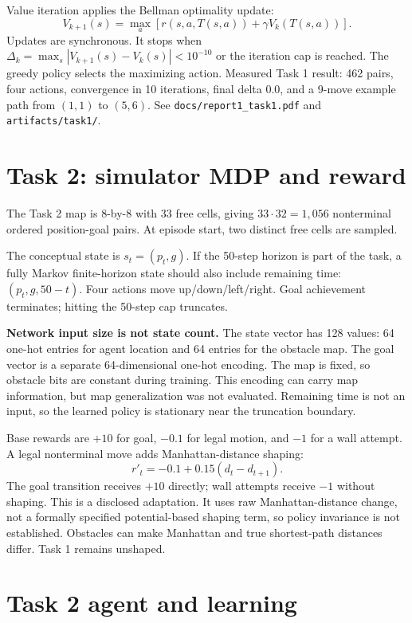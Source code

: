 \documentclass[11pt,a4paper]{article}
\begin{document}
Value iteration applies the Bellman optimality update:
\[
V_{k+1}(s)=\max_a[r(s,a,T(s,a))+\gamma V_k(T(s,a))].
\]
Updates are synchronous. It stops when $\Delta_k=\max_s|V_{k+1}(s)-V_k(s)|<10^{-10}$ or the iteration cap is reached. The greedy policy selects the maximizing action. Measured Task 1 result: 462 pairs, four actions, convergence in 10 iterations, final delta 0.0, and a 9-move example path from $(1,1)$ to $(5,6)$. See \texttt{docs/report1\_task1.pdf} and \texttt{artifacts/task1/}.

\section{Task 2: simulator MDP and reward}

The Task 2 map is 8-by-8 with 33 free cells, giving $33\cdot32=1,056$ nonterminal ordered position-goal pairs. At episode start, two distinct free cells are sampled.

The conceptual state is $s_t=(p_t,g)$. If the 50-step horizon is part of the task, a fully Markov finite-horizon state should also include remaining time: $(p_t,g,50-t)$. Four actions move up/down/left/right. Goal achievement terminates; hitting the 50-step cap truncates.

\textbf{Network input size is not state count.} The state vector has 128 values: 64 one-hot entries for agent location and 64 entries for the obstacle map. The goal vector is a separate 64-dimensional one-hot encoding. The map is fixed, so obstacle bits are constant during training. This encoding can carry map information, but map generalization was not evaluated. Remaining time is not an input, so the learned policy is stationary near the truncation boundary.

Base rewards are $+10$ for goal, $-0.1$ for legal motion, and $-1$ for a wall attempt. A legal nonterminal move adds Manhattan-distance shaping:
\[
r'_t=-0.1+0.15(d_t-d_{t+1}).
\]
The goal transition receives $+10$ directly; wall attempts receive $-1$ without shaping. This is a disclosed adaptation. It uses raw Manhattan-distance change, not a formally specified potential-based shaping term, so policy invariance is not established. Obstacles can make Manhattan and true shortest-path distances differ. Task 1 remains unshaped.

\section{Task 2 agent and learning}
\end{document}
